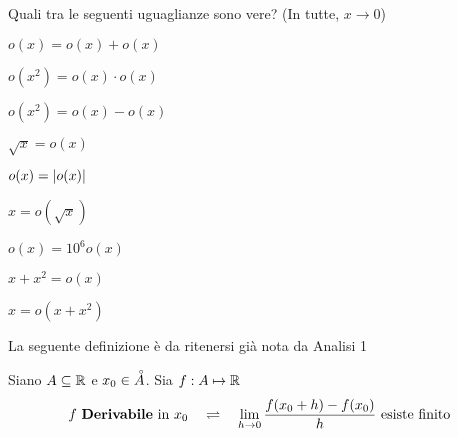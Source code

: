 \begin{exercise}
	Quali tra le seguenti uguaglianze sono vere? (In tutte, $x \to 0$)
	\begin{itemize}
		\begin{minipage}{0.33\linewidth}
			\item $o(x) = o(x) + o(x)$
			\item $o(x^2) = o(x) \cdot o(x)$
			\item $o(x^2) = o(x) - o(x)$
		\end{minipage}
		\begin{minipage}{0.33\linewidth}
			\item $\sqrt{x} = o(x)$
			\item $o(x) = \left|o(x)\right|$
			\item $x = o(\sqrt{x})$
		\end{minipage}
		\begin{minipage}{0.33\linewidth}
			\item $o(x) = 10^6 o(x)$
			\item $x + x^2 = o(x)$
			\item $x = o(x + x^2)$
		\end{minipage}
	\end{itemize}
\end{exercise}
La seguente definizione è da ritenersi già nota da Analisi 1
\begin{definition}[Derivata in $\R$]
	Siano $A \subseteq \mathbb{R}$ e $x_0 \in \accentset{\circ}{A}$. Sia $f: A \mapsto \mathbb{R}$
	\[f \text{ \textbf{Derivabile} in } x_0 \quad \rightleftharpoons \quad \lim\limits_{h \to 0} \frac{f(x_0 + h) - f(x_0)}{h} \text{  esiste finito}\]
\end{definition}


